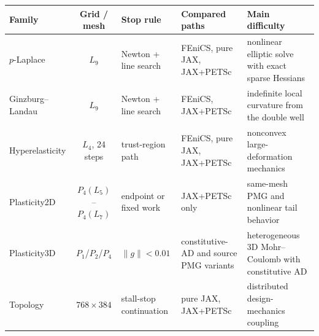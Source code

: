 \begin{tabular}{@{}l c >{\RaggedRight\arraybackslash}p{} >{\RaggedRight\arraybackslash}p{} >{\RaggedRight\arraybackslash}p{}@{}}
\toprule
Family & Grid / mesh & Stop rule & Compared paths & Main difficulty \\
\midrule
$p$-Laplace & $L_{9}$ & Newton + line search & FEniCS, pure JAX, JAX+PETSc & nonlinear elliptic solve with exact sparse Hessians \\
Ginzburg--Landau & $L_{9}$ & Newton + line search & FEniCS, JAX+PETSc & indefinite local curvature from the double well \\
Hyperelasticity & $L_{4}$, 24 steps & trust-region path & FEniCS, pure JAX, JAX+PETSc & nonconvex large-deformation mechanics \\
Plasticity2D & $P_{4}(L_{5})$--$P_{4}(L_{7})$ & endpoint or fixed work & JAX+PETSc only & same-mesh PMG and nonlinear tail behavior \\
Plasticity3D & $P_{1}$/$P_{2}$/$P_{4}$ & $\|g\| < \num{0.01}$ & constitutive-AD and source PMG variants & heterogeneous 3D Mohr--Coulomb with constitutive AD \\
Topology & $768\times384$ & stall-stop continuation & pure JAX, JAX+PETSc & distributed design-mechanics coupling \\
\bottomrule
\end{tabular}
